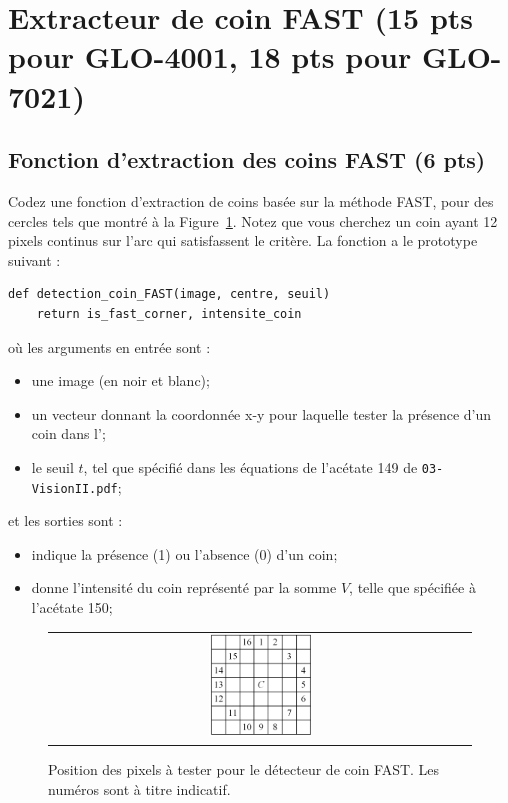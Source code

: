 \documentclass[12pt]{article}
\begin{document}
\newpage
\section{Extracteur de coin FAST (15 pts pour GLO-4001, 18 pts pour GLO-7021)}
 \label{SectionFAST}

\subsection{Fonction d'extraction des coins FAST (6 pts)}
Codez une fonction d'extraction de coins basée sur la méthode FAST, pour des cercles tels que montré à la Figure~\ref{FastPixelOrder}. Notez que vous cherchez un coin ayant 12 pixels continus sur l'arc qui satisfassent le critère. La fonction a le prototype suivant :
\vspace{-0.05in}
\begin{verbatim}
def detection_coin_FAST(image, centre, seuil)
    return is_fast_corner, intensite_coin
\end{verbatim}
\vspace{-0.05in}
où les arguments en entrée sont :
\begin{itemize}
\item {} une image (en noir et blanc);
\item {} un vecteur donnant la coordonnée x-y pour laquelle tester la présence d'un coin dans l';
\item {} le seuil $t$, tel que spécifié dans les équations de l'acétate 149 de \texttt{03-VisionII.pdf};
\end{itemize}
et les sorties sont :
\begin{itemize}
\item {} indique la présence (1) ou l'absence (0) d'un coin;
\item {} donne l'intensité du coin représenté par la somme $V$, telle que spécifiée à l'acétate 150;
\end{itemize}

\begin{figure}[ht]
 \begin{center}
  \begin{tabular}{c}
    \includegraphics[width=0.25\textwidth]{FastPixelOrder.png} 
  \end{tabular}
 \end{center}
\vspace{-0.25in}
 \caption{Position des pixels à tester pour le détecteur de coin FAST. Les numéros sont à titre indicatif.}
 \label{FastPixelOrder}
\end{figure}
\end{document}
